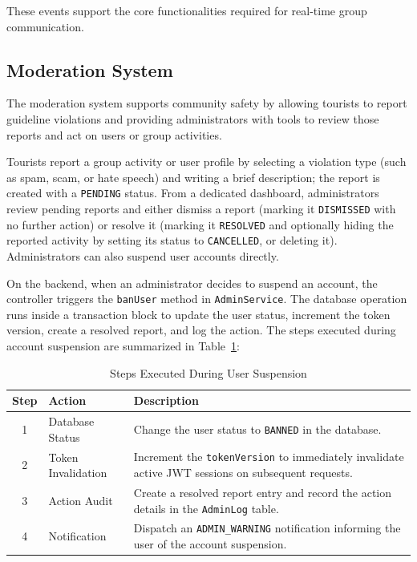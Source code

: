 \documentclass[a4paper,12pt]{report}
\begin{document}
These events support the core functionalities required for real-time group communication.

\subsection{Moderation System}

The moderation system supports community safety by allowing tourists to report guideline violations and providing administrators with tools to review those reports and act on users or group activities.

Tourists report a group activity or user profile by selecting a violation type (such as spam, scam, or hate speech) and writing a brief description; the report is created with a \texttt{PENDING} status. From a dedicated dashboard, administrators review pending reports and either dismiss a report (marking it \texttt{DISMISSED} with no further action) or resolve it (marking it \texttt{RESOLVED} and optionally hiding the reported activity by setting its status to \texttt{CANCELLED}, or deleting it). Administrators can also suspend user accounts directly.

On the backend, when an administrator decides to suspend an account, the controller triggers the \texttt{banUser} method in \texttt{AdminService}. The database operation runs inside a transaction block to update the user status, increment the token version, create a resolved report, and log the action. The steps executed during account suspension are summarized in Table~\ref{tab:ban_process}:

\begin{table}[H]
\centering
\begin{tabular}{|c|p{3.5cm}|p{9.5cm}|}
\hline
\textbf{Step} & \textbf{Action} & \textbf{Description} \\ \hline
1 & Database Status & Change the user status to \texttt{BANNED} in the database. \\ \hline
2 & Token Invalidation & Increment the \texttt{tokenVersion} to immediately invalidate active JWT sessions on subsequent requests. \\ \hline
3 & Action Audit & Create a resolved report entry and record the action details in the \texttt{AdminLog} table. \\ \hline
4 & Notification & Dispatch an \texttt{ADMIN\_WARNING} notification informing the user of the account suspension. \\ \hline
\end{tabular}
\caption{Steps Executed During User Suspension}
\label{tab:ban_process}
\end{table}
\end{document}
